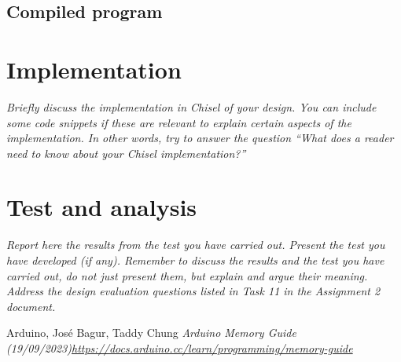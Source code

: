 \documentclass[a4paper, english]{article}
\numberwithin{equation}{section}
\begin{document}
\subsection{Compiled program}
\section{Implementation}
\emph{Briefly discuss the implementation in Chisel of your design. You can include some code snippets if these are relevant to explain certain aspects of the implementation. In other words, try to answer the question “What does a reader need to know about your Chisel implementation?”}
\section{Test and analysis}
\emph{Report here the results from the test you have carried out. Present the test you have developed (if any). Remember to discuss the results and the test you have carried out, do not just present them, but explain and argue their meaning. Address the design evaluation questions listed in Task 11 in the Assignment 2 document.}
\begin{thebibliography}{1}
    Arduino, José Bagur, Taddy Chung \emph{Arduino Memory Guide (19/09/2023)\newline \href{https://docs.arduino.cc/learn/programming/memory-guide}{https://docs.arduino.cc/learn/programming/memory-guide}}
\end{thebibliography}

%
%




%
\end{document}
